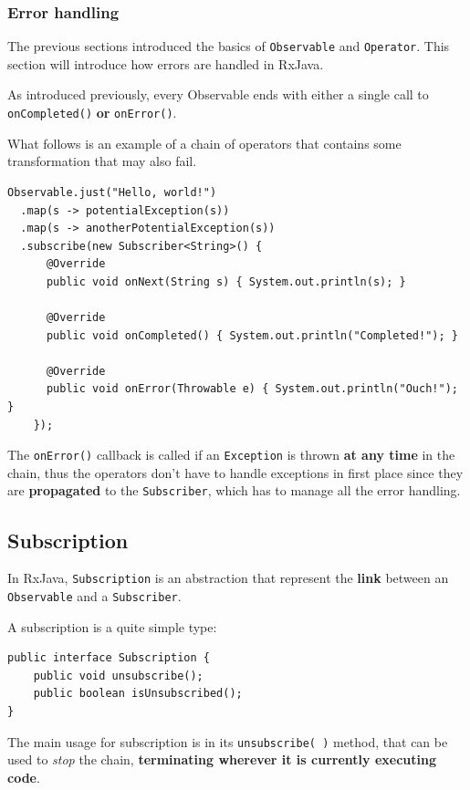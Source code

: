 \subsubsection{Error handling}\label{error-handling}

The previous sections introduced the basics of \texttt{Observable} and
\texttt{Operator}. This section will introduce how errors are handled in
RxJava.

As introduced previously, every Observable ends with either a single
call to \texttt{onCompleted()} \textbf{or} \texttt{onError()}.

What follows is an example of a chain of operators that contains some
transformation that may also fail.

\begin{verbatim}
Observable.just("Hello, world!")
  .map(s -> potentialException(s))
  .map(s -> anotherPotentialException(s))
  .subscribe(new Subscriber<String>() {
      @Override
      public void onNext(String s) { System.out.println(s); }

      @Override
      public void onCompleted() { System.out.println("Completed!"); }

      @Override
      public void onError(Throwable e) { System.out.println("Ouch!"); }
    });
\end{verbatim}

The \texttt{onError()} callback is called if an \texttt{Exception} is
thrown \textbf{at any time} in the chain, thus the operators don't have
to handle exceptions in first place since they are \textbf{propagated}
to the \texttt{Subscriber}, which has to manage all the error handling.


\subsection{Subscription}\label{subscription}

In RxJava, \texttt{Subscription} is an abstraction that represent the
\textbf{link} between an \texttt{Observable} and a \texttt{Subscriber}.

A subscription is a quite simple type:

\begin{verbatim}
public interface Subscription {
    public void unsubscribe();
    public boolean isUnsubscribed();
}
\end{verbatim}

The main usage for subscription is in its \texttt{unsubscribe(\ )}
method, that can be used to \emph{stop} the chain, \textbf{terminating
wherever it is currently executing code}.

